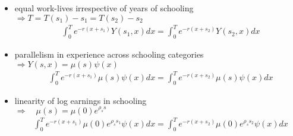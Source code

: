 \begin{frame}
\begin{itemize}
\item equal work-lives irrespective of years of schooling \\\vspace{0.3cm}
\hspace{0.3cm}$\Rightarrow T = T(s_1) - s_1 = T(s_2) - s_2$\vspace{0.3cm}
\begin{align*}
&\int_{0}^T e^{-r(x + s_1)}Y(s_1, x) dx  = \int_{0}^T e^{-r(x + s_2)}Y(s_2, x) dx
\end{align*}
\end{itemize}
\end{frame}
\begin{frame}
\begin{itemize}
\item parallelism in experience across schooling categories \\\vspace{0.3cm}
\hspace{0.3cm}$\Rightarrow Y(s, x) = \mu(s)\psi(x)$\vspace{0.3cm}
\begin{align*}
&\int_{0}^T e^{-r(x + s_1)} \mu(s)\psi(x) dx  = \int_{0}^T e^{-r(x + s_2)} \mu(s)\psi(x)dx
\end{align*}
\end{itemize}
\end{frame}
\begin{frame}
\begin{itemize}
\item linearity of log earnings in schooling \\\vspace{0.3cm}
\hspace{0.3cm}$\Rightarrow\quad \mu(s) = \mu(0)e^{\rho_s s}$\vspace{0.3cm}
\begin{align*}
&\int_{0}^T e^{-r(x + s_1)} \mu(0)e^{\rho_s s_1}\psi(x) dx  = \int_{0}^T e^{-r(x + s_2)} \mu(0)e^{\rho_s s_2}\psi(x)dx
\end{align*}
\end{itemize}
\end{frame}
